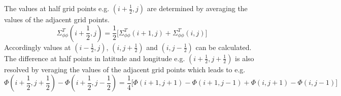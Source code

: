 %
The values at half grid points e.g. $(i+\frac{1}{2},j)$ are determined
by averaging the values of the adjacent grid points.
%
\begin{equation}
 \Sigma_{\phi \phi}^T(i+\frac{1}{2},j) = \frac{1}{2}
   \bigl[ \Sigma_{\phi \phi}^T(i+1,j) +  \Sigma_{\phi \phi}^T(i,j) \bigr]
\end{equation}
%
Accordingly values at $(i-\frac{1}{2},j)$, $(i,j+\frac{1}{2})$ and
$(i,j-\frac{1}{2})$ can be calculated. The difference at half points
in latitude and longitude e.g.  $(i+\frac{1}{2},j+\frac{1}{2})$
is also resolved by veraging the values of the adjacent grid 
points which leads to e.g.
%
\begin{equation}
 \Phi(i+\frac{1}{2},j+\frac{1}{2}) - \Phi(i+\frac{1}{2},j-\frac{1}{2}) = \frac{1}{4}
   \bigl[ \Phi(i+1,j+1) -\Phi(i+1,j-1) + \Phi(i,j+1)- \Phi(i,j-1) \bigr]
\end{equation}
%
